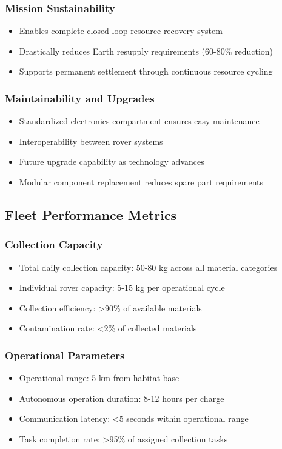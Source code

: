 \documentclass[12pt, a4paper]{article}
\begin{document}
\subsubsection{Mission Sustainability}
\begin{itemize}
    \item Enables complete closed-loop resource recovery system
    \item Drastically reduces Earth resupply requirements (60-80\% reduction)
    \item Supports permanent settlement through continuous resource cycling
\end{itemize}

\subsubsection{Maintainability and Upgrades}
\begin{itemize}
    \item Standardized electronics compartment ensures easy maintenance
    \item Interoperability between rover systems
    \item Future upgrade capability as technology advances
    \item Modular component replacement reduces spare part requirements
\end{itemize}

\subsection{Fleet Performance Metrics}

\subsubsection{Collection Capacity}
\begin{itemize}
    \item Total daily collection capacity: 50-80 kg across all material categories
    \item Individual rover capacity: 5-15 kg per operational cycle
    \item Collection efficiency: >90\% of available materials
    \item Contamination rate: <2\% of collected materials
\end{itemize}

\subsubsection{Operational Parameters}
\begin{itemize}
    \item Operational range: 5 km from habitat base
    \item Autonomous operation duration: 8-12 hours per charge
    \item Communication latency: <5 seconds within operational range
    \item Task completion rate: >95\% of assigned collection tasks
\end{itemize}
\end{document}
